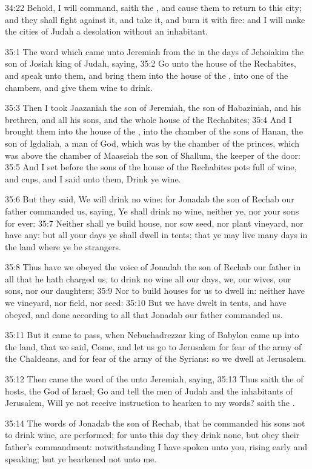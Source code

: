 34:22 Behold, I will command, saith the \LORD, and cause them to return
to this city; and they shall fight against it, and take it, and burn
it with fire: and I will make the cities of Judah a desolation without
an inhabitant.

35:1 The word which came unto Jeremiah from the \LORD in the days of
Jehoiakim the son of Josiah king of Judah, saying, 35:2 Go unto the
house of the Rechabites, and speak unto them, and bring them into the
house of the \LORD, into one of the chambers, and give them wine to
drink.

35:3 Then I took Jaazaniah the son of Jeremiah, the son of Habaziniah,
and his brethren, and all his sons, and the whole house of the
Rechabites; 35:4 And I brought them into the house of the \LORD, into
the chamber of the sons of Hanan, the son of Igdaliah, a man of God,
which was by the chamber of the princes, which was above the chamber
of Maaseiah the son of Shallum, the keeper of the door: 35:5 And I set
before the sons of the house of the Rechabites pots full of wine, and
cups, and I said unto them, Drink ye wine.

35:6 But they said, We will drink no wine: for Jonadab the son of
Rechab our father commanded us, saying, Ye shall drink no wine,
neither ye, nor your sons for ever: 35:7 Neither shall ye build house,
nor sow seed, nor plant vineyard, nor have any: but all your days ye
shall dwell in tents; that ye may live many days in the land where ye
be strangers.

35:8 Thus have we obeyed the voice of Jonadab the son of Rechab our
father in all that he hath charged us, to drink no wine all our days,
we, our wives, our sons, nor our daughters; 35:9 Nor to build houses
for us to dwell in: neither have we vineyard, nor field, nor seed:
35:10 But we have dwelt in tents, and have obeyed, and done according
to all that Jonadab our father commanded us.

35:11 But it came to pass, when Nebuchadrezzar king of Babylon came up
into the land, that we said, Come, and let us go to Jerusalem for fear
of the army of the Chaldeans, and for fear of the army of the Syrians:
so we dwell at Jerusalem.

35:12 Then came the word of the \LORD unto Jeremiah, saying, 35:13 Thus
saith the \LORD of hosts, the God of Israel; Go and tell the men of
Judah and the inhabitants of Jerusalem, Will ye not receive
instruction to hearken to my words? saith the \LORD.

35:14 The words of Jonadab the son of Rechab, that he commanded his
sons not to drink wine, are performed; for unto this day they drink
none, but obey their father's commandment: notwithstanding I have
spoken unto you, rising early and speaking; but ye hearkened not unto
me.

